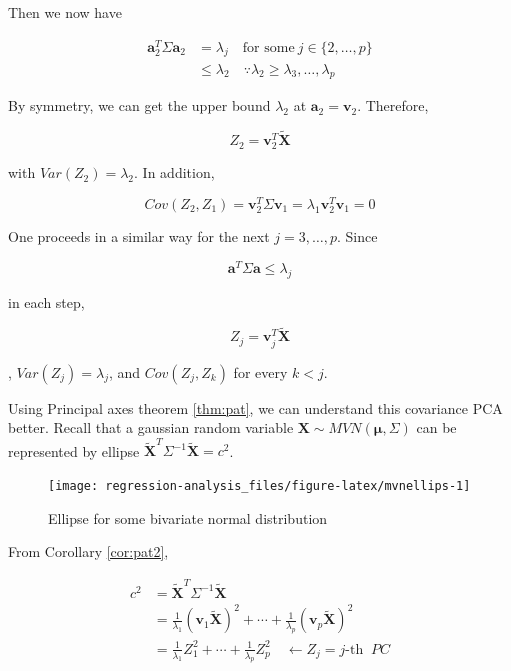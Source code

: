 \documentclass[]{book}
\theoremstyle{definition}
\theoremstyle{definition}
\theoremstyle{definition}
\theoremstyle{remark}
\begin{document}
Then we now have

\begin{equation*}
  \begin{split}
    \mathbf{a}_2^T \Sigma \mathbf{a}_2 & = \lambda_j \quad \text{for some}\: j \in \{ 2, \ldots, p \} \\
    & \le \lambda_2 \quad \because \lambda_2 \ge \lambda_3, \ldots, \lambda_p
  \end{split}
\end{equation*}

By symmetry, we can get the upper bound \(\lambda_2\) at \(\mathbf{a}_2 = \mathbf{v}_2\). Therefore,

\[Z_2 = \mathbf{v}_2^T \widetilde{\mathbf{X}}\]

with \(Var(Z_2) = \lambda_2\). In addition,

\[Cov(Z_2, Z_1) = \mathbf{v}_2^T \Sigma \mathbf{v}_1 = \lambda_1 \mathbf{v}_2^T \mathbf{v}_1 = 0\]

One proceeds in a similar way for the next \(j = 3, \ldots, p\). Since

\[\mathbf{a}^T \Sigma \mathbf{a} \le \lambda_j\]

in each step,

\[Z_j = \mathbf{v}_j^T \widetilde{\mathbf{X}}\]

, \(Var(Z_j) = \lambda_j\), and \(Cov(Z_j, Z_k)\) for every \(k < j\).

Using Principal axes theorem \ref{thm:pat}, we can understand this covariance PCA better. Recall that a gaussian random variable \(\mathbf{X} \sim MVN(\boldsymbol\mu, \Sigma)\) can be represented by ellipse \(\widetilde{\mathbf{X}}^T \Sigma^{-1} \widetilde{\mathbf{X}} = c^2\).

\begin{figure}[H]

{\centering \texttt{[image: regression-analysis\_files/figure-latex/mvnellips-1]} 

}

\caption{Ellipse for some bivariate normal distribution}\label{fig:mvnellips}
\end{figure}

From Corollary \ref{cor:pat2},

\begin{equation}
  \begin{split}
    c^2 & = \widetilde{\mathbf{X}}^T \Sigma^{-1} \widetilde{\mathbf{X}} \\
    & = \frac{1}{\lambda_1} (\mathbf{v}_1 \widetilde{\mathbf{X}})^2 + \cdots + \frac{1}{\lambda_p} (\mathbf{v}_p \widetilde{\mathbf{X}})^2 \\
    & = \frac{1}{\lambda_1} Z_1^2 + \cdots + \frac{1}{\lambda_p} Z_p^2 \quad \leftarrow Z_j = j \text{-th }\: PC
  \end{split}
  \label{eq:patpca}
\end{equation}
\end{document}
